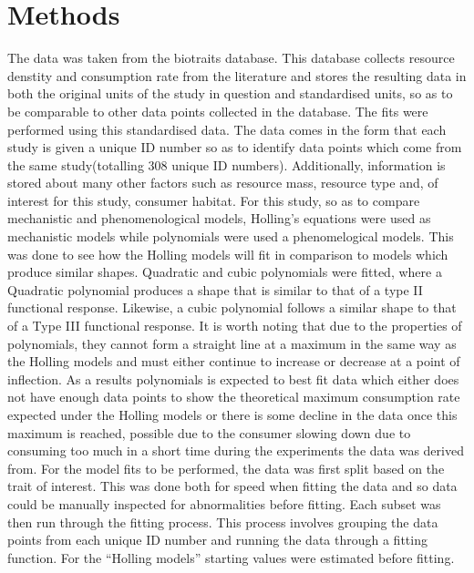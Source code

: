 \documentclass[a4paper]{article}
\numberwithin{equation}{section}
\begin{document}
\section{Methods}
The data was taken from the biotraits database.  This database collects resource denstity and consumption rate from the literature and stores the resulting data in both the original units of the study in question and standardised units, so as to be comparable to other data points collected in the database.  The fits were performed using this standardised data.  The data comes in the form that each study is given a unique ID number so as to identify data points which come from the same study(totalling 308 unique ID numbers).  Additionally, information is stored about many other factors such as resource mass, resource type and, of interest for this study, consumer habitat. 
\newline 
For this study, so as to compare mechanistic and phenomenological models, Holling's equations were used as mechanistic models while polynomials were used a phenomelogical models.  This was done to see how the Holling models will fit in comparison to models which produce similar shapes.  Quadratic and cubic polynomials were fitted, where a Quadratic polynomial produces a shape that is similar to that of a type II functional response.  Likewise, a cubic polynomial follows a similar shape to that of a Type III functional response.  It is worth noting that due to the properties of polynomials, they cannot form a straight line at a maximum in the same way as the Holling models and must either continue to increase or decrease at a point of inflection.  As a results polynomials is expected to best fit data which either does not have enough data points to show the theoretical maximum consumption rate expected under the Holling models or there is some decline in the data once this maximum is reached, possible due to the consumer slowing down due to consuming too much in a short time during the experiments the data was derived from.
\newline
For the model fits to be performed, the data was first split based on the trait of interest.  This was done both for speed when fitting the data and so data could be manually inspected for abnormalities before fitting.  Each subset was then run through the fitting process.  This process involves grouping the data points from each unique ID number and running the data through a fitting function.  For the “Holling models” starting values were estimated before fitting. 
\newline 
\end{document}
